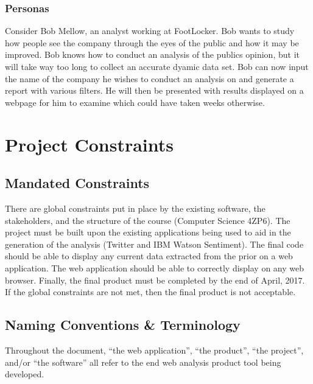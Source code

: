 \documentclass[12pt]{article}
\begin{document}
\subsubsection{Personas}
Consider Bob Mellow, an analyst working at FootLocker. Bob wants to study how people see the company through the eyes of the public and how it may be improved. Bob knows how to conduct an analysis of the publics opinion, but it will take way too long to collect an accurate dyamic data set. Bob can now input the name of the company he wishes to conduct an analysis on and generate a report with various filters. He will then be presented with results displayed on a webpage for him to examine which could have taken weeks otherwise.

\newpage
\section{Project Constraints}

\subsection{Mandated Constraints} %
There are global constraints put in place by the existing software, the stakeholders, and the structure of the course (Computer Science 4ZP6). The project must be built upon the existing applications being used to aid in the generation of the analysis (Twitter and IBM Watson Sentiment). The final code should be able to display any current data extracted from the prior on a web application. The web application should be able to correctly display on any web browser. Finally, the final product must be completed by the end of April, 2017. If the global constraints are not met, then the final product is not acceptable.\\ 


\subsection{Naming Conventions \& Terminology} %
Throughout the document, ``the web application'', ``the product'', ``the project'', and/or ``the software'' all refer to the end web analysis product tool being developed.\\ 
\end{document}
